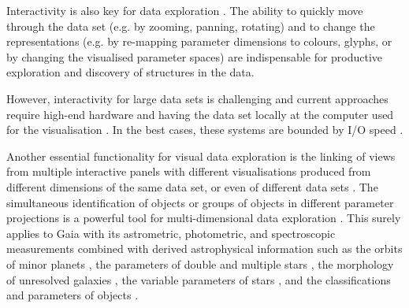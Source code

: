 \documentclass[longauth, final]{aa}
\begin{document}
Interactivity is also key for data exploration \citep[e.g.][]{Keim:2002:IVV:614285.614508}. 
The ability to quickly move through the data set (e.g. by zooming, panning, rotating) and to change the representations (e.g. by re-mapping parameter dimensions to colours, glyphs, or by changing the visualised parameter spaces) are  indispensable for productive exploration and discovery of structures in the data. 


However, interactivity for large data sets is challenging \citep{2012AN....333..505G} and current approaches require high-end hardware and having the data set locally at the computer used for the visualisation \citep[e.g.][]{2013MNRAS.429.2442H}. In the best cases, these systems are bounded by I/O speed \citep[e.g.][for GPU-based visualisation of  large-scale n-body simulations]{2008arXiv0811.2055S}.


Another essential functionality for visual data exploration is the linking of views from multiple interactive panels with different visualisations produced from different dimensions of the same data set, or even of different data sets \citep[e.g.][]{tukey1977,Jern:2007, Tanaka:2014}. The simultaneous  identification of objects or groups of objects in different parameter projections is a powerful tool for multi-dimensional data exploration \citep[][discusses this in a nice historical perspective]{2012AN....333..505G}.
This surely applies to Gaia with its astrometric, photometric, and spectroscopic measurements \citep{2016A&A...595A...4L, 2017A&A...599A..32V, 2011EAS....45..189K} combined with derived astrophysical information such as the orbits of minor planets  \citep{2016P&SS..123...87T}, the parameters of double and multiple stars  \citep{2011AIPC.1346..122P}, the morphology of unresolved galaxies  \citep{2013A&A...556A.102K}, the variable parameters of stars  \citep{2014EAS....67...75E}, and the classifications and parameters of objects \citep{2013A&A...559A..74B}.
\end{document}
